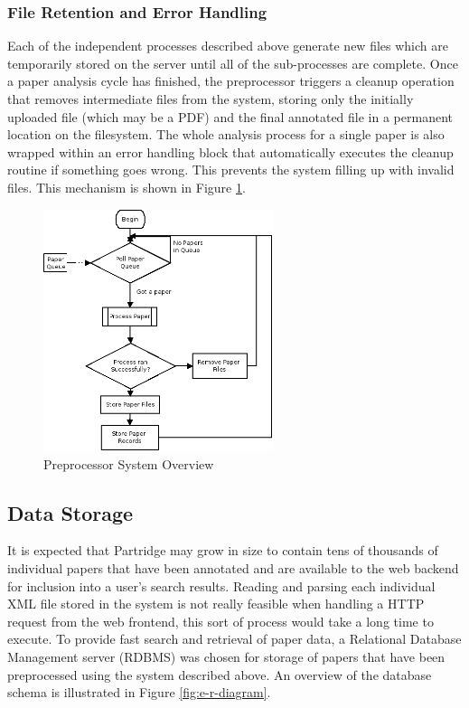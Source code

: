 \subsubsection{File Retention and Error Handling}

Each of the independent processes described above generate new files which are
temporarily stored on the server until all of the sub-processes are complete.
Once a paper analysis cycle has finished, the preprocessor triggers a cleanup
operation that removes intermediate files from the system, storing only the
initially uploaded file (which may be a PDF) and the final annotated file in a
permanent location on the filesystem.  The whole analysis process for a single
paper is also wrapped within an error handling block that automatically
executes the cleanup routine if something goes wrong. This prevents the system
filling up with invalid files. This mechanism is shown in Figure
\ref{fig:preprocessor_overview}.

\begin{figure}[!h]
\vspace{5mm}
\centering
\includegraphics[width=0.6\textwidth]{images/design/paper_processor_overview.png}
\caption{Preprocessor System Overview}
\label{fig:preprocessor_overview}
\end{figure}


\subsection{ Data Storage }
\label{sec:db_layout}
It is expected that Partridge may grow in size to contain
tens of thousands of individual papers that have been annotated and are available to
the web backend for inclusion into a user's search results. Reading and
parsing each individual XML file stored in the system is not really feasible
when handling a HTTP request from the web frontend, this sort of process would
take a long time to execute. To provide fast search and retrieval of paper
data, a Relational Database Management server (RDBMS) was chosen for storage of
papers that have been preprocessed using the system described above. An
overview of the database schema is illustrated in Figure \ref{fig:e-r-diagram}.

